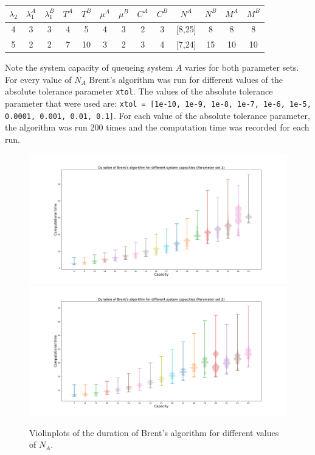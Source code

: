 \begin{center}
    \small
    \begin{tabular}{||c|c|c|c|c|c|c|c|c|c|c|c|c||}
        \hline
        \(\lambda_2\) & \(\lambda_1^A\) & \(\lambda_1^B\) & \(T^A\) & \(T^B\) &
        \(\mu^A\) & \(\mu^B\) & \(C^A\) & \(C^B\) & \(N^A\) & \(N^B\) & \(M^A\) &
        \(M^B\) \\
        \hline\hline
        4 & 3 & 3 & 4 & 5 & 4 & 3 & 2 & 3 & [8,25] & 8 & 8 & 8 \\
        \hline
        5 & 2 & 2 & 7 & 10 & 3 & 2 & 3 & 4 & [7,24] & 15 & 10 & 10 \\
        \hline
    \end{tabular}
\end{center}
    
Note the system capacity of queueing system \(A\) varies for both parameter sets.
For every value of \(N_A\) Brent's algorithm was run for different values of
the absolute tolerance parameter \lstinline[style=pystyle]{xtol}.
The values of the absolute tolerance parameter that were used are:
\lstinline[style=pystyle]
{xtol = [1e-10, 1e-9, 1e-8, 1e-7, 1e-6, 1e-5, 0.0001, 0.001, 0.01, 0.1]}.
For each value of the absolute tolerance parameter, the algorithm was run 200
times and the computation time was recorded for each run.


\begin{figure}[H]
    \centering
    \includegraphics[width=\textwidth]{chapters/04_game_theoretic_model/img/brents_method/tolerance/tolerance_violinplots_1.pdf}
    \includegraphics[width=\textwidth]{chapters/04_game_theoretic_model/img/brents_method/tolerance/tolerance_violinplots_2.pdf}
    \caption{
        Violinplots of the duration of Brent's algorithm for different values of
        \(N_A\).
    }
    \label{fig:tolerance_violinplots}
\end{figure}

